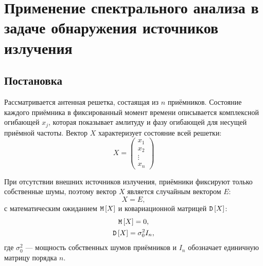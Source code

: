 \chapter{Применение спектрального анализа в задаче обнаружения источников излучения}
\section{Постановка}

Рассматривается антенная решетка, состаящая из $n$ приёмников. Состояние каждого приёмника в фиксированный момент времени описывается комплексной огибающей $x_j$,
которая показывает амлитуду и фазу огибающей для несущей приёмной частоты. Вектор $X$ характеризует состояние всей решетки:
\[
    X
    = \begin{pmatrix}
        x_1    \\
        x_2    \\
        \vdots \\
        x_n
    \end{pmatrix}
\]

При отсутствии внешних источников излучения, приёмники фиксируют только собственные шумы, поэтому вектор $X$ является случайным вектором $E$:
\[
    X = E ,
\]
с математическим ожиданием $\mathtt{M} \left[ X \right]$ и ковариационной матрицей $\mathtt{D} \left[ X \right]$:
\begin{gather*}
    \mathtt{M} \left[ X \right] = 0 , \\
    \mathtt{D} \left[ X \right] = \sigma_0^2 I_n,
\end{gather*}
где $\sigma_0^2$ --- мощность собственных шумов приёмников и $I_n$ обозначает единичную матрицу порядка $n$.

